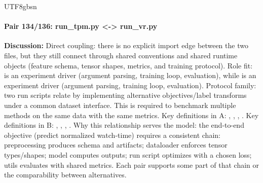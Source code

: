 \documentclass[11pt]{article}
\begin{document}
\begin{CJK*}{UTF8}{gbsn}
\paragraph{Pair 134/136: run\_tpm.py <-> run\_vr.py}
\textbf{Discussion:} Direct coupling: there is no explicit import edge between the two files, but they still connect through shared conventions and shared runtime objects (feature schema, tensor shapes, metrics, and training protocol). Role fit: \texttt{} is an experiment driver (argument parsing, training loop, evaluation), while \texttt{} is an experiment driver (argument parsing, training loop, evaluation). Protocol family: two run scripts relate by implementing alternative objectives/label transforms under a common dataset interface. This is required to benchmark multiple methods on the same data with the same metrics. Key definitions in A: \texttt{}, \texttt{}, \texttt{}, \texttt{}. Key definitions in B: \texttt{}, \texttt{}, \texttt{}, \texttt{}. Why this relationship serves the model: the end-to-end objective (predict normalized watch-time) requires a consistent chain: preprocessing produces schema and artifacts; dataloader enforces tensor types/shapes; model computes outputs; run script optimizes with a chosen loss; utils evaluates with shared metrics. Each pair supports some part of that chain or the comparability between alternatives.


\end{CJK*}
\end{document}
